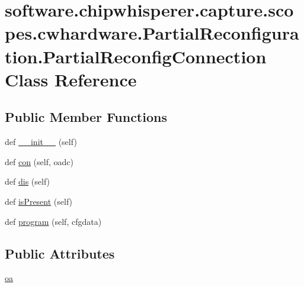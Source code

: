 \hypertarget{classsoftware_1_1chipwhisperer_1_1capture_1_1scopes_1_1cwhardware_1_1PartialReconfiguration_1_1PartialReconfigConnection}{}\section{software.\+chipwhisperer.\+capture.\+scopes.\+cwhardware.\+Partial\+Reconfiguration.\+Partial\+Reconfig\+Connection Class Reference}
\label{classsoftware_1_1chipwhisperer_1_1capture_1_1scopes_1_1cwhardware_1_1PartialReconfiguration_1_1PartialReconfigConnection}
\subsection*{Public Member Functions}
\begin{DoxyCompactItemize}
\item 
def \hyperlink{classsoftware_1_1chipwhisperer_1_1capture_1_1scopes_1_1cwhardware_1_1PartialReconfiguration_1_1PartialReconfigConnection_ac2fe9246079ef6d1404c703d4ea87671}{\+\_\+\+\_\+init\+\_\+\+\_\+} (self)
\item 
def \hyperlink{classsoftware_1_1chipwhisperer_1_1capture_1_1scopes_1_1cwhardware_1_1PartialReconfiguration_1_1PartialReconfigConnection_ac4c8c8aa8531bf3dccc48e4fbc050a0f}{con} (self, oadc)
\item 
def \hyperlink{classsoftware_1_1chipwhisperer_1_1capture_1_1scopes_1_1cwhardware_1_1PartialReconfiguration_1_1PartialReconfigConnection_a6dac4abcc605a21c7acf894b52fdbcb2}{dis} (self)
\item 
def \hyperlink{classsoftware_1_1chipwhisperer_1_1capture_1_1scopes_1_1cwhardware_1_1PartialReconfiguration_1_1PartialReconfigConnection_a10575f9918ae6adb291fd61e65411f14}{is\+Present} (self)
\item 
def \hyperlink{classsoftware_1_1chipwhisperer_1_1capture_1_1scopes_1_1cwhardware_1_1PartialReconfiguration_1_1PartialReconfigConnection_a5e42bbc171ec708f0b4fd3e4676fb4df}{program} (self, cfgdata)
\end{DoxyCompactItemize}
\subsection*{Public Attributes}
\begin{DoxyCompactItemize}
\item 
\hyperlink{classsoftware_1_1chipwhisperer_1_1capture_1_1scopes_1_1cwhardware_1_1PartialReconfiguration_1_1PartialReconfigConnection_a13cdf006aa85db7e688df730b1904b1b}{oa}
\end{DoxyCompactItemize}
